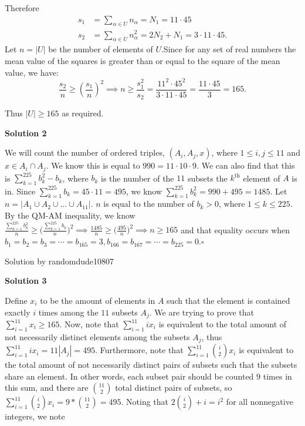 \begin{enumerate}
 Therefore
 \begin{align*} s_1 &= \sum_{\alpha \in U} n_\alpha = N_1 = 11\cdot45 \\ s_2 &= \sum_{\alpha \in U} n_\alpha^2 = 2N_2 + N_1 = 3\cdot11\cdot45. \end{align*}
Let $n = |U|$ be the number of elements of $U$.Since for any set of real numbers the mean value of the squares is greater than or equal to the square of the mean value, we have:
 \[\frac{s_2}n \ge \left(\frac{s_1}n\right)^2 \implies n \ge \frac{s_1^2}{s_2} = \frac{11^2\cdot 45^2}{3\cdot11\cdot45} = \frac{11\cdot45}3 = 165.\]

 Thus $|U| \ge 165$ as required.

 



\textbf{Solution 2}

We will count the number of ordered triples, $(A_i,A_j,x)$, where $1\le i,j\le11$ and $x\in A_i \cap A_j$. We know this is equal to $990=11\cdot10\cdot9$­. We can also find that this is $\sum_{k=1}^{225}b_k^2-b_k$, where $b_k$ is the number of the $11$ subsets the $k^{\text{th}}$ element of $A$ is in. Since $\sum_{k=1}^{225}b_k=45\cdot11=495$, we know $\sum_{k=1}^{225}b_k^2=990+495=1485$. Let $n=|A_1 \cup A_2 \cup \dots \cup A_{11}|$. $n$ is equal to the number of $b_k>0$, where $1\le k\le225$. By the QM-AM inequality, we know $\frac{\sum_{k=1}^{225}b_k^2}n\ge\Bigg(\frac{\sum_{k=1}^{225}b_k}n\Bigg)^2\implies\frac{1485}n\ge\Big(\frac{495}n\Big)^2\implies n\ge165$ and that equality occurs when $b_1=b_2=b_3=\cdots=b_{165}=3,b_{166}=b_{167}=\cdots=b_{225}=0$.$\square$

 Solution by randomdude10807

 



\textbf{Solution 3}

Define $x_i$ to be the amount of elements in $A$ such that the element is contained exactly $i$ times among the $11$ subsets $A_j$. We are trying to prove that $\sum_{i=1}^{11}x_i\ge 165$. Now, note that $\sum_{i=1}^{11}ix_i$ is equivalent to the total amount of not necessarily distinct elements among the subsets $A_j$, thus $\sum_{i=1}^{11}ix_i=11|A_j|=495$. Furthermore, note that $\sum_{i=1}^{11}\binom{i}{2}x_i$ is equivalent to the total amount of not necessarily distinct pairs of subsets such that the subsets share an element. In other words, each subset pair should be counted $9$ times in this sum, and there are $\binom{11}{2}$ total distinct pairs of subsets, so $\sum_{i=1}^{11}\binom{i}{2}x_i=9*\binom{11}{2}=495$. Noting that $2\binom{i}{2}+i=i^2$ for all nonnegative integers, we note


\end{enumerate}
